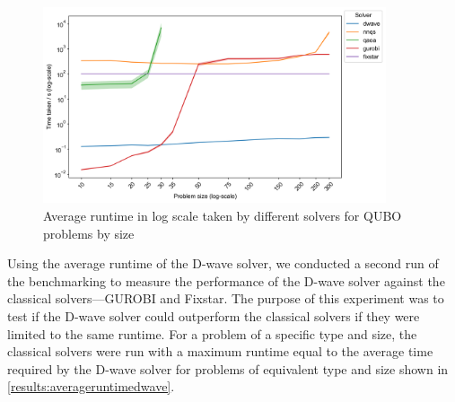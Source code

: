 \begin{figure}[!htbp]
    \centering
    \includegraphics[width=0.9\textwidth]{images/all_time_average.png}
    \caption{Average runtime in log scale taken by different solvers for QUBO problems by size}
    \label{results:timeaverage}
\end{figure}

Using the average runtime of the D-wave solver, we conducted a second run of the benchmarking to measure the performance of the D-wave solver against the classical solvers---GUROBI and Fixstar. The purpose of this experiment was to test if the D-wave solver could outperform the classical solvers if they were limited to the same runtime. For a problem of a specific type and size, the classical solvers were run with a maximum runtime equal to the average time required by the D-wave solver for problems of equivalent type and size shown in \autoref{results:averageruntimedwave}.

\begin{table}[!ht]
    \centering
    \caption{Average runtime (seconds) of the D-wave solver by problem type and size. Dashes indicate that the D-wave solver was not able to embed problems of that size.}
    \label{results:averageruntimedwave}
\end{table}

